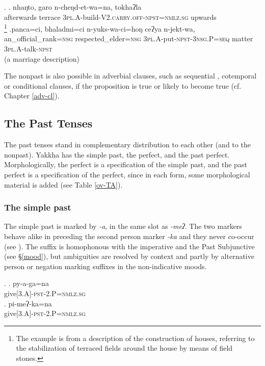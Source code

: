 \ex. \ag. nhaŋto, garo n-cheŋd-et-wa=na,      tokhaʔla\\
afterwards terrace {\scshape 3pl.A-}build{\scshape -V2.carry.off-npst=nmlz.sg} upwards\\
\footnote{The example is from a description of the  construction of houses, referring to the stabilization of terraced fields around the house by means of field stones.}  
\bg.panca=ci, bhaladmi=ci n-yuks-wa-ci=hoŋ  ceʔya n-jekt-wa,\\
an\_official\_rank{\scshape =nsg} respected\_elder{\scshape =nsg} {\scshape 3pl.A-}put{\scshape -npst-3nsg.P=seq} matter {\scshape 3pl.A-}talk{\scshape -npst}\\
 (a marriage description) 

The nonpast is also possible in adverbial  clauses, such as sequential \Last[b], cotemporal or conditional clauses, if the proposition is true or likely to become true (cf. Chapter \ref{adv-cl}). 

\subsection{The Past Tenses}\label{pst}

The past tenses stand in complementary distribution to each other (and to the nonpast). Yakkha has the simple past, the perfect, and the past perfect. Morphologically, the perfect is a specification of the simple past, and the past perfect is a specification of the perfect, since in each form, some morphological material is added (see Table \ref{ov-TA}).

\subsubsection{The simple past}\label{sim-pst}

The simple past is marked by \emph{-a}, in the same slot as \emph{-meʔ}. The two markers behave alike in preceding the second person marker \emph{-ka} and they never co-occur (see \Next). The suffix is homophonous with the imperative and the Past Subjunctive (see §\ref{mood}), but ambiguities are resolved by context and partly by alternative person or negation marking suffixes in the non-indicative moods.

\ex. \ag.  py-a-ga=na\\
			give{\scshape [3.A]-pst-2.P=nmlz.sg}\\
	\bg. pi-meʔ-ka=na\\ 
			give{\scshape [3.A]-pst-2.P=nmlz.sg}\\
			
